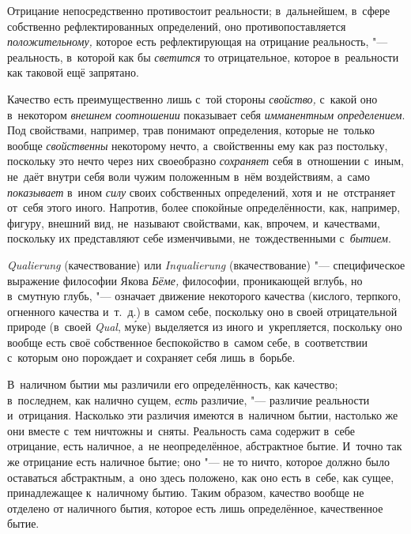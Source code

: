 Отрицание непосредственно противостоит реальности; в~дальнейшем, в~сфере
собственно рефлектированных определений, оно противопоставляется
{\em положительному,} которое есть рефлектирующая на
отрицание реальность, "--- реальность, в~которой как бы
{\em светится} то отрицательное, которое в~реальности
как таковой ещё запрятано.

Качество есть преимущественно лишь с~той стороны {\em свойство,} с~какой оно
в~некотором {\em внешнем соотношении} показывает себя {\em имманентным
определением}. Под свойствами, например, трав понимают определения, которые
не~только вообще {\em свойственны} некоторому нечто, а~свойственны ему как раз
постольку, поскольку это нечто через них своеобразно {\em сохраняет} себя
в~отношении с~иным, не~даёт внутри себя воли чужим положенным в~нём
воздействиям, а~само {\em показывает} в~ином {\em силу} своих собственных
определений, хотя и~не~отстраняет от~себя этого иного. Напротив, более
спокойные определённости, как, например, фигуру, внешний вид, не~называют
свойствами, как, впрочем, и~качествами, поскольку их представляют себе
изменчивыми, не~тождественными с~{\em бытием}.

{\em Quali\-erung} (качествование) или {\em Inquali\-erung} (вкачествование)
"--- специфическое выражение философии Якова {\em Бёме,} философии, проникающей
вглубь, но в~смутную глубь, "--- означает движение некоторого качества
(кислого, терпкого, огненного качества и~т.~д.) в~самом себе, поскольку оно в
своей отрицательной природе (в~своей {\em Qual},
м\'{у}ке) выделяется из иного и~укрепляется, поскольку оно вообще есть своё
собственное беспокойство в~самом себе, в~соответствии с~которым оно порождает
и сохраняет себя лишь в~борьбе.


В~наличном бытии мы различили его определённость, как качество; в~последнем,
как налично сущем, {\em есть} различие, "--- различие реальности и~отрицания.
Насколько эти различия имеются в~наличном бытии, настолько же они вместе с~тем
ничтожны и~сняты. Реальность сама содержит в~себе отрицание, есть наличное,
а~не неопределённое, абстрактное бытие. И~точно так же отрицание есть наличное
бытие; оно "--- не то ничто, которое должно было оставаться абстрактным, а~оно
здесь положено, как оно есть в~себе, как сущее, принадлежащее к~наличному
бытию. Таким образом, качество вообще не отделено от наличного бытия, которое
есть лишь определённое, качественное бытие.

